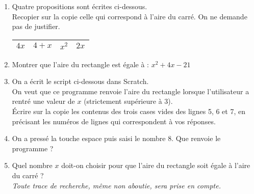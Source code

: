 \begin{enumerate}[itemsep=1em]
\item Quatre propositions sont écrites ci-dessous.\\
Recopier sur la copie celle qui correspond à l'aire du carré. On ne demande pas de justifier.\\
\renewcommand{\arraystretch}{1.5}
\begin{tabular}{|>{\centering\arraybackslash}p{3cm}|>{\centering\arraybackslash}p{3cm}|>{\centering\arraybackslash}p{3cm}|>{\centering\arraybackslash}p{3cm}|}
\hline
    $4x$ &  $4+x$ & $x^2$ & $2x$ \\
 \hline
\end{tabular}
\renewcommand{\arraystretch}{1}

\item Montrer que l'aire du rectangle est égale à : $x^2+4x-21$
\item On a écrit le script ci-dessous dans Scratch.\\
On veut que ce programme renvoie l'aire du rectangle lorsque l'utilisateur a rentré une valeur de $x$ (strictement supérieure à 3).\\
Écrire sur la copie les contenus des trois cases vides des lignes 5, 6 et 7, en précisant les numéros de lignes qui correspondent à vos réponses.\\
     \begin{scratch}[scale=0.75,print]
	\end{scratch}

\item On a pressé la touche espace puis saisi le nombre 8. Que renvoie le programme ?

\item Quel nombre $x$ doit-on choisir pour que l'aire du rectangle soit égale à l'aire du carré ?\\
\textit{Toute trace de recherche, même non aboutie, sera prise en compte.}


\end{enumerate}
\medskip

